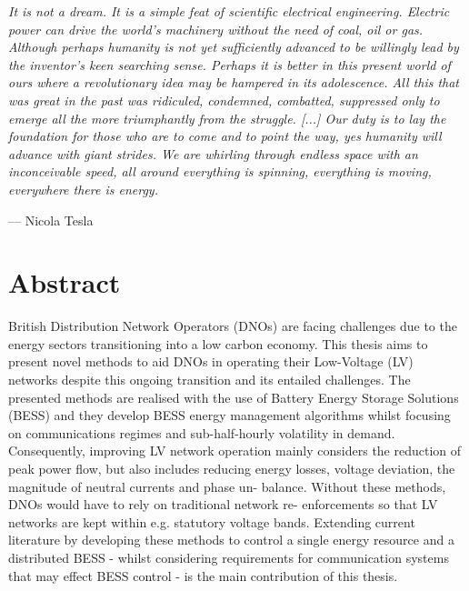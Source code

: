 
\epigraph{\textit{It is not a dream. It is a simple feat of scientific electrical engineering. Electric power can drive the world's machinery without the need of coal, oil or gas. Although perhaps humanity is not yet sufficiently advanced to be willingly lead by the inventor's keen searching sense. Perhaps it is better in this present world of ours where a revolutionary idea may be hampered in its adolescence. All this that was great in the past was ridiculed, condemned, combatted, suppressed only to emerge all the more triumphantly from the struggle. [...] Our duty is to lay the foundation for those who are to come and to point the way, yes humanity will advance with giant strides. We are whirling through endless space with an inconceivable speed, all around everything is spinning, everything is moving, everywhere there is energy.}}{--- Nicola Tesla}


\chapter*{Abstract}




British Distribution Network Operators (DNOs) are facing challenges due to the\linebreak
energy sectors transitioning into a low carbon economy. This thesis aims to present\linebreak
novel methods to aid DNOs in operating their Low-Voltage (LV) networks despite this\linebreak
ongoing transition and its entailed challenges. The presented methods are realised\linebreak
with the use of Battery Energy Storage Solutions (BESS) and they develop BESS\linebreak
energy management algorithms whilst focusing on communications regimes and\linebreak
sub-half-hourly volatility in demand. Consequently, improving LV network operation\linebreak
mainly considers the reduction of peak power flow, but also includes reducing\linebreak
energy losses, voltage deviation, the magnitude of neutral currents and phase un-\linebreak
balance. Without these methods, DNOs would have to rely on traditional network re-\linebreak
enforcements so that LV networks are kept within e.g. statutory voltage bands.\linebreak
Extending current literature by developing these methods to control a single energy\linebreak
resource and a distributed BESS - whilst considering requirements for communication\linebreak
systems that may effect BESS control - is the main contribution of this thesis.

